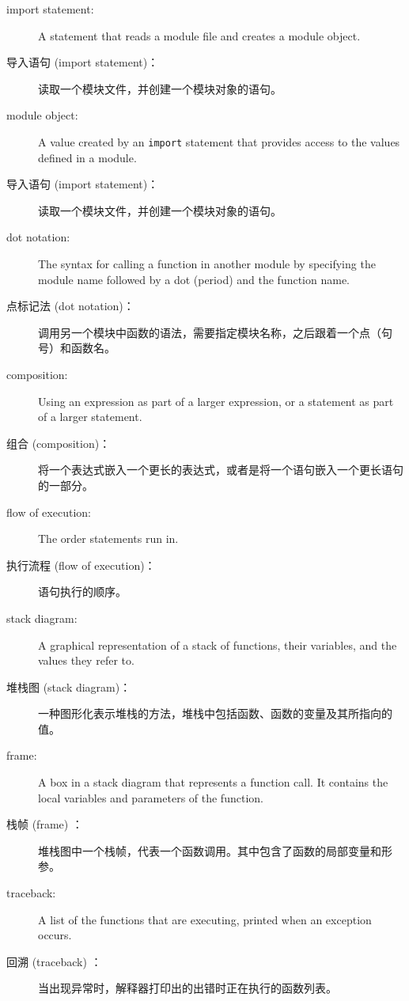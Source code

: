 \begin{description}
\item[import statement:] A statement that reads a module file and creates
a module object.
  

\item[导入语句 (import statement)：] 读取一个模块文件，并创建一个模块对象的语句。

\item[module object:] A value created by an {\tt import} statement
that provides access to the values defined in a module.

\item[导入语句 (import statement)：] 读取一个模块文件，并创建一个模块对象的语句。

\item[dot notation:]  The syntax for calling a function in another
module by specifying the module name followed by a dot (period) and
the function name.

\item[点标记法 (dot notation)：] 调用另一个模块中函数的语法，需要指定模块名称，之后跟着一个点（句号）和函数名。

\item[composition:] Using an expression as part of a larger expression,
or a statement as part of a larger statement.

\item[组合 (composition)：] 将一个表达式嵌入一个更长的表达式，或者是将一个语句嵌入一个更长语句的一部分。

\item[flow of execution:]  The order statements run in.

\item[执行流程 (flow of execution)：] 语句执行的顺序。

\item[stack diagram:]  A graphical representation of a stack of functions,
their variables, and the values they refer to.

\item[堆栈图 (stack diagram)：] 一种图形化表示堆栈的方法，堆栈中包括函数、函数的变量及其所指向的值。

\item[frame:]  A box in a stack diagram that represents a function call.
It contains the local variables and parameters of the function.

\item[栈帧 (frame) ：] 堆栈图中一个栈帧，代表一个函数调用。其中包含了函数的局部变量和形参。

\item[traceback:]  A list of the functions that are executing,
printed when an exception occurs.

\item[回溯 (traceback) ：] 当出现异常时，解释器打印出的出错时正在执行的函数列表。

\end{description}


